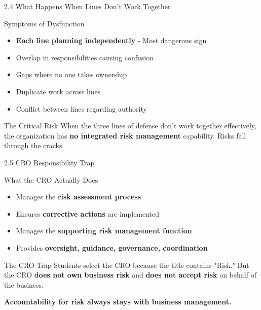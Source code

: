 \documentclass{beamer}
\begin{document}
	\begin{frame}{2.4 What Happens When Lines Don't Work Together}
		\begin{block}{Symptoms of Dysfunction}
			\begin{itemize}
				\item \textbf{Each line planning independently} - Most dangerous sign
				\item Overlap in responsibilities causing confusion
				\item Gaps where no one takes ownership
				\item Duplicate work across lines
				\item Conflict between lines regarding authority
			\end{itemize}
		\end{block}
		
		\begin{alertblock}{The Critical Risk}
			When the three lines of defense don't work together effectively, the organization has \textbf{no integrated risk management} capability. Risks fall through the cracks.
		\end{alertblock}
	\end{frame}
	
	\begin{frame}{2.5 CRO Responsibility Trap}
		\begin{block}{What the CRO Actually Does}
			\begin{itemize}
				\item Manages the \textbf{risk assessment process}
				\item Ensures \textbf{corrective actions} are implemented
				\item Manages the \textbf{supporting risk management function}
				\item Provides \textbf{oversight, guidance, governance, coordination}
			\end{itemize}
		\end{block}
		
		\begin{alertblock}{The CRO Trap}
			Students select the CRO because the title contains "Risk." But the CRO \textbf{does not own business risk} and \textbf{does not accept risk} on behalf of the business.
			
			\textbf{Accountability for risk always stays with business management.}
		\end{alertblock}
	\end{frame}
	
\end{document}
